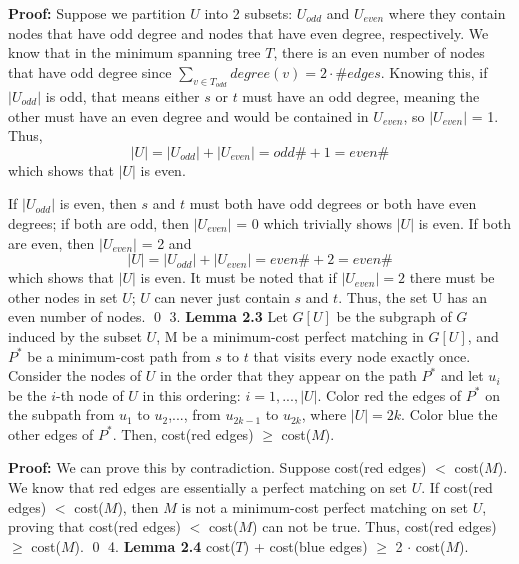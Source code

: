 \documentclass[oneside]{homework} %
\begin{document}
\textbf{Proof:} Suppose we partition $U$ into 2 subsets: $U_{odd}$ and $U_{even}$ where they contain nodes that have odd degree and nodes that have even degree, respectively. We know that in the minimum spanning tree $T$, there is an even number of nodes that have odd degree since $\sum\limits_{v\in T_{odd}}degree(v) = 2\cdot \# edges$. Knowing this, if $|U_{odd}|$ is odd, that means either $s$ or $t$ must have an odd degree, meaning the other must have an even degree and would be contained in $U_{even}$, so $|U_{even}|$ = 1.  Thus, $$|U| = |U_{odd}|+| U_{even}| = odd\# + 1 = even\# $$ which shows that $|U|$ is even. 

If $|U_{odd}|$ is even, then $s$ and $t$ must both have odd degrees or both have even degrees; if both are odd, then $|U_{even}|$ = 0 which trivially shows $|U|$ is even. If both are even, then $|U_{even}|$ = 2 and $$|U| = |U_{odd}|+| U_{even}| = even\# + 2 = even\# $$ which shows that $|U|$ is even. It must be noted that if $|U_{even}| = 2$ there must be other nodes in set $U$; $U$ can never just contain $s$ and $t$. Thus, the set U has an even number of nodes. \hfill\qed
\newline
\newline
{\large3.} \textbf{Lemma 2.3} Let $G[U]$ be the subgraph of $G$ induced by the subset $U$, M be a minimum-cost perfect matching in $G[U]$, and $P^*$ be a minimum-cost path from $s$ to $t$ that visits every node exactly once. Consider the nodes of $U$ in the order that they appear on the path $P^*$ and let $u_i$ be the $i$-th node of $U$ in this ordering: $ i=1,...,|U|$. Color red the edges of $P^*$ on the subpath from $u_1$ to $u_2$,..., from $u_{2k-1}$ to $u_{2k}$, where $|U|=2k$. Color blue the other edges of $P^*$. Then, cost(red edges) $\geq$ cost($M$).
\newline

\textbf{Proof:} We can prove this by contradiction. Suppose cost(red edges) $<$ cost($M$). We know that red edges are essentially a perfect matching on set $U$. If cost(red edges) $<$ cost($M$), then $M$ is not a minimum-cost perfect matching on set $U$, proving that cost(red edges) $<$ cost($M$) can not be true. Thus, cost(red edges) $\geq$ cost($M$). \hfill\qed
\newline
\newline
{\large4.} \textbf{Lemma 2.4} cost($T$) + cost(blue edges) $\geq$ 2 $\cdot$ cost($M$).
\newline
\end{document}
